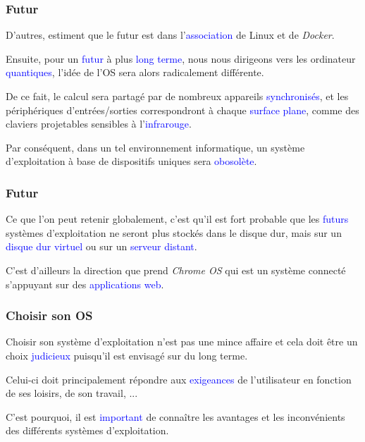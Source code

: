 \documentclass[aspectratio=169]{beamer}
\begin{document}
\begin{frame}
  \frametitle{Futur}
  D'autres, estiment que le futur est dans l'\textcolor{blue}{association}
  de Linux et de \textit{Docker}.

  \hspace{0.5cm}

  Ensuite, pour un \textcolor{blue}{futur} à plus \textcolor{blue}{long terme},
  nous nous dirigeons vers les ordinateur \textcolor{blue}{quantiques}, l'idée
  de l'OS sera alors radicalement différente.

  \hspace{0.5cm}

  De ce fait, le calcul sera partagé par de nombreux appareils
  \textcolor{blue}{synchronisés}, et les périphériques
  d'entrées/sorties correspondront à chaque \textcolor{blue}{surface plane},
  comme des claviers projetables sensibles à l'\textcolor{blue}{infrarouge}.

  \hspace{0.5cm}

  Par conséquent, dans un tel environnement informatique, un système
  d'exploitation à base de dispositifs uniques sera
  \textcolor{blue}{obosolète}.
\end{frame}

\begin{frame}
  \frametitle{Futur}
  Ce que l'on peut retenir globalement, c'est qu'il est fort probable que les
  \textcolor{blue}{futurs} systèmes d'exploitation ne seront plus stockés dans
  le disque dur, mais sur un \textcolor{blue}{disque dur virtuel} ou sur un
  \textcolor{blue}{serveur distant}.

  \hspace{0.5cm}

  C'est d'ailleurs la direction que prend \textit{Chrome OS} qui est un système
  connecté s'appuyant sur des \textcolor{blue}{applications web}.
\end{frame}

\begin{frame}
  \frametitle{Choisir son OS}
  Choisir son système d'exploitation n'est pas une mince affaire et cela doit
  être un choix \textcolor{blue}{judicieux} puisqu'il est envisagé sur du long
  terme.

  \hspace{0.5cm}

  Celui-ci doit principalement répondre aux \textcolor{blue}{exigeances} de
  l'utilisateur en fonction de ses loisirs, de son travail, ...

  \hspace{0.5cm}

  C'est pourquoi, il est \textcolor{blue}{important} de connaître les avantages
  et les inconvénients des différents systèmes d'exploitation.
\end{frame}
\end{document}
